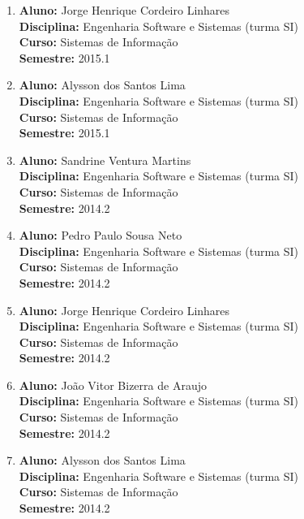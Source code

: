 \begin{enumerate}
\item   \textbf{Aluno:} Jorge Henrique Cordeiro Linhares \mbox{} \\
        \textbf{Disciplina:}  Engenharia Software e Sistemas (turma SI)\\
        \textbf{Curso:} Sistemas de Informação\\
        \textbf{Semestre:} 2015.1

\item   \textbf{Aluno:} Alysson dos Santos Lima \mbox{} \\
        \textbf{Disciplina:}  Engenharia Software e Sistemas (turma SI)\\
        \textbf{Curso:} Sistemas de Informação\\
        \textbf{Semestre:} 2015.1

\item   \textbf{Aluno:} Sandrine Ventura Martins \mbox{} \\
        \textbf{Disciplina:}  Engenharia Software e Sistemas (turma SI)\\
        \textbf{Curso:} Sistemas de Informação\\
        \textbf{Semestre:} 2014.2

\item   \textbf{Aluno:} Pedro Paulo Sousa Neto \mbox{} \\
        \textbf{Disciplina:}  Engenharia Software e Sistemas (turma SI)\\
        \textbf{Curso:} Sistemas de Informação\\
        \textbf{Semestre:} 2014.2

\item   \textbf{Aluno:} Jorge Henrique Cordeiro Linhares \mbox{} \\
        \textbf{Disciplina:}  Engenharia Software e Sistemas (turma SI)\\
        \textbf{Curso:} Sistemas de Informação\\
        \textbf{Semestre:} 2014.2

\item   \textbf{Aluno:} João Vitor Bizerra de Araujo \mbox{} \\
        \textbf{Disciplina:}  Engenharia Software e Sistemas (turma SI)\\
        \textbf{Curso:} Sistemas de Informação\\
        \textbf{Semestre:} 2014.2

\item   \textbf{Aluno:} Alysson dos Santos Lima \mbox{} \\
        \textbf{Disciplina:}  Engenharia Software e Sistemas (turma SI)\\
        \textbf{Curso:} Sistemas de Informação\\
        \textbf{Semestre:} 2014.2

\end{enumerate}
